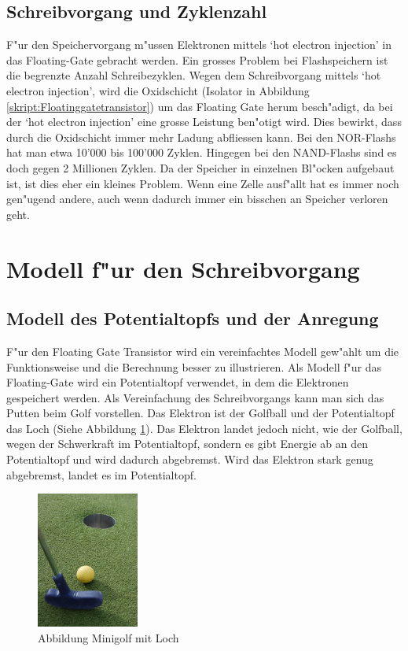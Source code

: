 \begin{refsection}
\subsection{Schreibvorgang und Zyklenzahl}
F"ur den Speichervorgang m"ussen Elektronen mittels `hot electron injection'
%
in das Floating-Gate gebracht werden. Ein grosses Problem bei
Flashspeichern ist die begrenzte Anzahl Schreibezyklen.
Wegen dem Schreibvorgang mittels `hot electron injection', wird die
Oxidschicht (Isolator in Abbildung \ref{skript:Floatinggatetransistor}) um das Floating Gate herum
besch"adigt, da bei der `hot electron injection' eine grosse Leistung
ben"otigt wird.
Dies bewirkt, dass durch die Oxidschicht immer mehr Ladung abfliessen kann.
Bei den NOR-Flashs hat man etwa 10'000 bis 100'000 Zyklen.
Hingegen bei den NAND-Flashs sind es doch gegen 2 Millionen Zyklen.
Da der Speicher in einzelnen Bl"ocken aufgebaut ist, ist dies
eher ein kleines Problem.
Wenn eine Zelle ausf"allt hat es immer noch gen"ugend andere, auch wenn
dadurch immer ein bisschen an Speicher verloren geht.

\section{Modell f"ur den Schreibvorgang}
\subsection{Modell des Potentialtopfs und der Anregung}
F"ur den Floating Gate Transistor wird ein vereinfachtes Modell
gew"ahlt um die Funktionsweise und die Berechnung besser zu illustrieren.
Als Modell f"ur das Floating-Gate wird ein Potentialtopf verwendet,
in dem die Elektronen gespeichert werden.
Als Vereinfachung des Schreibvorgangs kann man sich das Putten beim
Golf vorstellen.
Das Elektron ist der Golfball und der Potentialtopf das Loch (Siehe Abbildung \ref{skript:Minigolf}).
Das Elektron landet jedoch nicht, wie der Golfball, wegen der Schwerkraft
im Potentialtopf, sondern es gibt Energie ab an den Potentialtopf und
wird dadurch abgebremst.
Wird das Elektron stark genug abgebremst, landet es im Potentialtopf.

\begin{figure}
\centering
\includegraphics[width=0.3\textwidth]{flash/graphics/Minigolf.jpg}
\caption{Abbildung Minigolf mit Loch \cite{flash:golf}
\label{skript:Minigolf}}
\end{figure}


\end{refsection}
